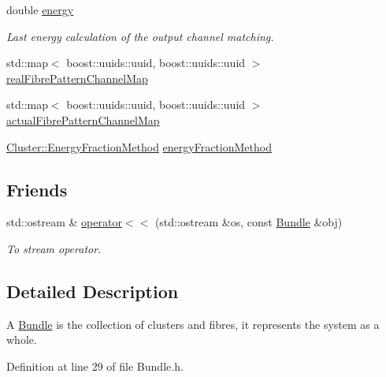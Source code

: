 \begin{DoxyCompactItemize}
double \hyperlink{classcryomesh_1_1structures_1_1Bundle_aac5229c4c52e646767db2144ba745aa6}{energy}
\begin{DoxyCompactList}\small\item\em \-Last energy calculation of the output channel matching. \end{DoxyCompactList}\item 
std\-::map$<$ boost\-::uuids\-::uuid, \*
boost\-::uuids\-::uuid $>$ \hyperlink{classcryomesh_1_1structures_1_1Bundle_adaf7fa91209de01b9d42ae2d8228c3cd}{real\-Fibre\-Pattern\-Channel\-Map}
\item 
std\-::map$<$ boost\-::uuids\-::uuid, \*
boost\-::uuids\-::uuid $>$ \hyperlink{classcryomesh_1_1structures_1_1Bundle_a0f3e20833ce850f97ae450d27a4607dd}{actual\-Fibre\-Pattern\-Channel\-Map}
\item 
\hyperlink{classcryomesh_1_1structures_1_1Cluster_a69c420b79675c6ffc9a0df8381ca9497}{\-Cluster\-::\-Energy\-Fraction\-Method} \hyperlink{classcryomesh_1_1structures_1_1Bundle_abbd8555380ffa4c33a235636837bafaa}{energy\-Fraction\-Method}
\end{DoxyCompactItemize}
\subsection*{\-Friends}
\begin{DoxyCompactItemize}
\item 
std\-::ostream \& \hyperlink{classcryomesh_1_1structures_1_1Bundle_a21e43a0b5ea3e93accc964e269c730bd}{operator$<$$<$} (std\-::ostream \&os, const \hyperlink{classcryomesh_1_1structures_1_1Bundle}{\-Bundle} \&obj)
\begin{DoxyCompactList}\small\item\em \-To stream operator. \end{DoxyCompactList}\end{DoxyCompactItemize}


\subsection{\-Detailed \-Description}
\-A \hyperlink{classcryomesh_1_1structures_1_1Bundle}{\-Bundle} is the collection of clusters and fibres, it represents the system as a whole. 

\-Definition at line 29 of file \-Bundle.\-h.



